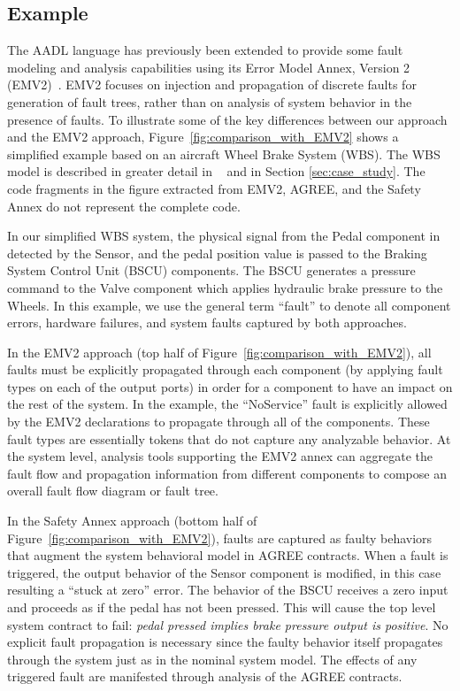 \subsection{Example}
\label{subsec:comparison_with_EMV2}

The AADL language has previously been extended to provide some fault modeling and analysis capabilities using its Error Model Annex, Version 2 (EMV2)~\cite{EMV2}.  EMV2 focuses on injection and propagation of discrete faults for generation of fault trees, rather than on analysis of system behavior in the presence of faults. 
To illustrate some of the key differences between our approach and the EMV2 approach, Figure~\ref{fig:comparison_with_EMV2} shows a simplified example based on an aircraft Wheel Brake System (WBS). The WBS model is described in greater detail in ~\cite{Stewart17:IMBSA} and in Section \ref{sec:case_study}. The code fragments in the figure extracted from EMV2, AGREE, and the Safety Annex do not represent the complete code.

In our simplified WBS system, the physical signal from the Pedal component in detected by the Sensor, and the pedal position value is passed to the Braking System Control Unit (BSCU) components.  The BSCU generates a pressure command to the Valve component which applies hydraulic brake pressure to the Wheels. In this example, we use the general term ``fault'' to denote all component errors, hardware failures, and system faults captured by both approaches.

In the EMV2 approach (top half of Figure~\ref{fig:comparison_with_EMV2}), all faults must be explicitly propagated through each component (by applying fault types on each of the output ports) in order for a component to have an impact on the rest of the system. In the example, the ``NoService'' fault is explicitly allowed by the EMV2 declarations to propagate through all of the components.  These fault types are essentially tokens that do not capture any analyzable behavior.  At the system level, analysis tools supporting the EMV2 annex can aggregate the fault flow and propagation information from different components to compose an overall fault flow diagram or fault tree.

In the Safety Annex approach (bottom half of Figure~\ref{fig:comparison_with_EMV2}), faults are captured as faulty behaviors that augment the system behavioral model in AGREE contracts.  When a fault is triggered, the output behavior of the Sensor component is modified, in this case resulting a ``stuck at zero'' error. The behavior of the BSCU receives a zero input and proceeds as if the pedal has not been pressed. This will cause the top level system contract to fail: {\em pedal pressed implies brake pressure output is positive}. No explicit fault propagation is necessary since the faulty behavior itself propagates through the system just as in the nominal system model. The effects of any triggered fault are manifested through analysis of the AGREE contracts. 

